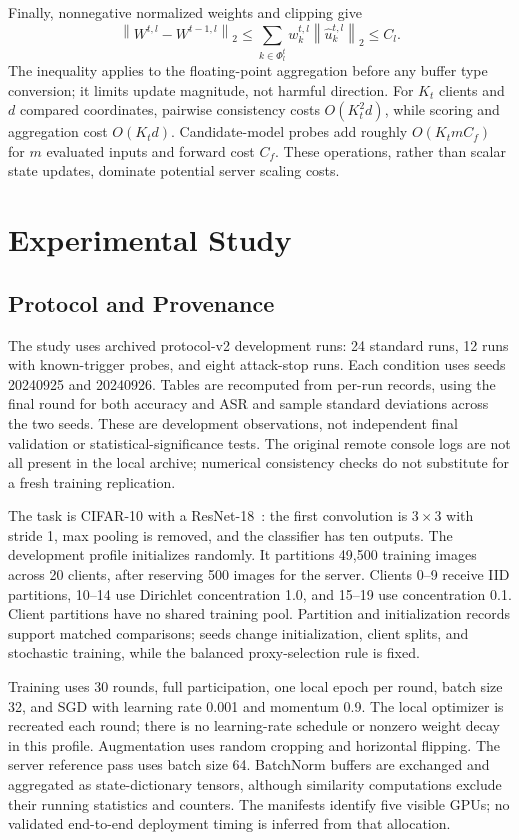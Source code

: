 \documentclass[conference,compsoc]{IEEEtran}
\newcommand{\norm}[1]{\left\lVert#1\right\rVert_2}
\begin{document}
Finally, nonnegative normalized weights and clipping give
\begin{equation}
 \norm{W^{t,l}-W^{t-1,l}}
 \le \sum_{k\in\Phi_l^t}w_k^{t,l}\norm{\widehat u_k^{t,l}}
 \le C_l.
\end{equation}
The inequality applies to the floating-point aggregation before any buffer type conversion; it limits update magnitude, not harmful direction. For $K_t$ clients and $d$ compared coordinates, pairwise consistency costs $O(K_t^2d)$, while scoring and aggregation cost $O(K_td)$. Candidate-model probes add roughly $O(K_t m C_f)$ for $m$ evaluated inputs and forward cost $C_f$. These operations, rather than scalar state updates, dominate potential server scaling costs.

\section{Experimental Study}
\subsection{Protocol and Provenance}
The study uses archived protocol-v2 development runs: 24 standard runs, 12 runs with known-trigger probes, and eight attack-stop runs. Each condition uses seeds 20240925 and 20240926. Tables are recomputed from per-run records, using the final round for both accuracy and ASR and sample standard deviations across the two seeds. These are development observations, not independent final validation or statistical-significance tests. The original remote console logs are not all present in the local archive; numerical consistency checks do not substitute for a fresh training replication.

The task is CIFAR-10 with a ResNet-18~\cite{he2016resnet}: the first convolution is $3\times3$ with stride 1, max pooling is removed, and the classifier has ten outputs. The development profile initializes randomly. It partitions 49,500 training images across 20 clients, after reserving 500 images for the server. Clients 0--9 receive IID partitions, 10--14 use Dirichlet concentration 1.0, and 15--19 use concentration 0.1. Client partitions have no shared training pool. Partition and initialization records support matched comparisons; seeds change initialization, client splits, and stochastic training, while the balanced proxy-selection rule is fixed.

Training uses 30 rounds, full participation, one local epoch per round, batch size 32, and SGD with learning rate 0.001 and momentum 0.9. The local optimizer is recreated each round; there is no learning-rate schedule or nonzero weight decay in this profile. Augmentation uses random cropping and horizontal flipping. The server reference pass uses batch size 64. BatchNorm buffers are exchanged and aggregated as state-dictionary tensors, although similarity computations exclude their running statistics and counters. The manifests identify five visible GPUs; no validated end-to-end deployment timing is inferred from that allocation.
\end{document}
